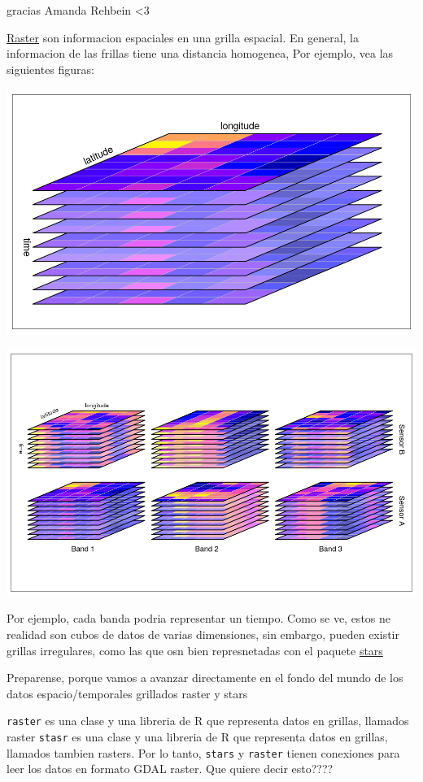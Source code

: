 \documentclass[]{book}
\begin{document}
gracias Amanda Rehbein \textless{}3

\href{https://r-spatial.github.io/stars/}{Raster} son informacion espaciales en una grilla espacial. En general, la informacion de las frillas tiene una distancia homogenea, Por ejemplo, vea las siguientes figuras:

\includegraphics{figs/cube1.png}

\includegraphics{figs/cube2.png}

Por ejemplo, cada banda podria representar un tiempo. Como se ve, estos ne realidad son cubos de datos de varias dimensiones, sin embargo, pueden existir grillas irregulares, como las que osn bien represnetadas con el paquete \href{https://r-spatial.github.io/stars/articles/stars4.html}{stars}

Preparense, porque vamos a avanzar directamente en el fondo del mundo de los datos espacio/temporales grillados raster y stars

\texttt{raster} es una clase y una libreria de R que representa datos en grillas, llamados raster
\texttt{stasr} es una clase y una libreria de R que representa datos en grillas, llamados tambien rasters.
Por lo tanto, \texttt{stars} y \texttt{raster} tienen conexiones para leer los datos en formato GDAL raster. Que quiere decir esto????
\end{document}
